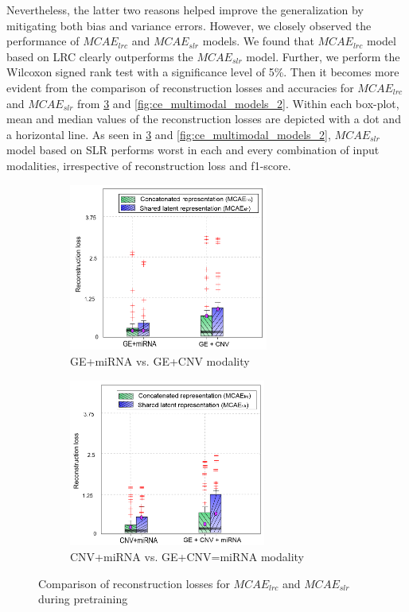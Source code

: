 \hspace*{3.5mm} Nevertheless, the latter two reasons helped improve the generalization by mitigating both bias and variance errors. However, we closely observed the performance of $MCAE_{lrc}$ and $MCAE_{slr}$ models. We found that $MCAE_{lrc}$ model based on LRC clearly outperforms the $MCAE_{slr}$ model. Further, we perform the Wilcoxon signed rank test with a significance level of 5\%. Then it becomes more evident from the comparison of reconstruction losses and accuracies for $MCAE_{lrc}$ and $MCAE_{slr}$ from \cref{fig:ce_multimodal_models_1} and \cref{fig:ce_multimodal_models_2}. Within each box-plot, mean and median values of the reconstruction losses are depicted with a dot and a horizontal line. As seen in \cref{fig:ce_multimodal_models_1} and \cref{fig:ce_multimodal_models_2}, $MCAE_{slr}$ model based on SLR performs worst in each and every combination of input modalities, irrespective of reconstruction loss and f1-score. 

\begin{figure}
	\centering
	\begin{subfigure}{.48\linewidth}
		\centering
		\includegraphics[width=0.9\linewidth,height=55mm]{images/ce_mcae_1.png}
		\caption{GE+miRNA vs. GE+CNV modality}
        \label{fig:ce_ge_mirna}
	\end{subfigure}
	\begin{subfigure}{0.48\linewidth}
		\centering
		\includegraphics[width=0.9\linewidth,height=55mm]{images/ce_mcae_2.png}
		\caption{CNV+miRNA vs. GE+CNV=miRNA modality}
        \label{fig:ce_ge_cnv}
	\end{subfigure}
	\caption{Comparison of reconstruction losses for $MCAE_{lrc}$ and $MCAE_{slr}$ during pretraining} 
	\label{fig:ce_multimodal_models_1}
\end{figure}

